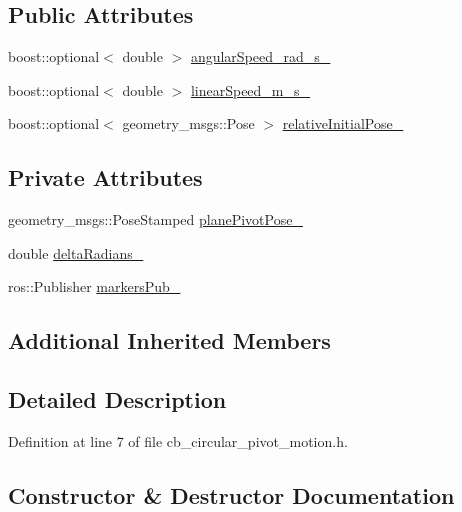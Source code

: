 \subsection*{Public Attributes}
\begin{DoxyCompactItemize}
\item 
boost\+::optional$<$ double $>$ \hyperlink{classcl__move__group__interface_1_1CbCircularPivotMotion_a39fa383804d82285e07fa1c5a37cc587}{angular\+Speed\+\_\+rad\+\_\+s\+\_\+}
\item 
boost\+::optional$<$ double $>$ \hyperlink{classcl__move__group__interface_1_1CbCircularPivotMotion_adf6f6bc7a7a55f5c3dff80475e33c2e3}{linear\+Speed\+\_\+m\+\_\+s\+\_\+}
\item 
boost\+::optional$<$ geometry\+\_\+msgs\+::\+Pose $>$ \hyperlink{classcl__move__group__interface_1_1CbCircularPivotMotion_a1b2cc65d2f27a4dec54c20f1f00d4bb8}{relative\+Initial\+Pose\+\_\+}
\end{DoxyCompactItemize}
\subsection*{Private Attributes}
\begin{DoxyCompactItemize}
\item 
geometry\+\_\+msgs\+::\+Pose\+Stamped \hyperlink{classcl__move__group__interface_1_1CbCircularPivotMotion_a0994efbe93b9f9a61fcf3703c360cda2}{plane\+Pivot\+Pose\+\_\+}
\item 
double \hyperlink{classcl__move__group__interface_1_1CbCircularPivotMotion_afade33f1182615c64ea972075bfd2b95}{delta\+Radians\+\_\+}
\item 
ros\+::\+Publisher \hyperlink{classcl__move__group__interface_1_1CbCircularPivotMotion_aee2c9918b0e0609e0201dc1219091938}{markers\+Pub\+\_\+}
\end{DoxyCompactItemize}
\subsection*{Additional Inherited Members}


\subsection{Detailed Description}


Definition at line 7 of file cb\+\_\+circular\+\_\+pivot\+\_\+motion.\+h.



\subsection{Constructor \& Destructor Documentation}
\mbox{\label{classcl__move__group__interface_1_1CbCircularPivotMotion_adbc4c7c67b9ba45fdb3cbb9fac950424}} 
